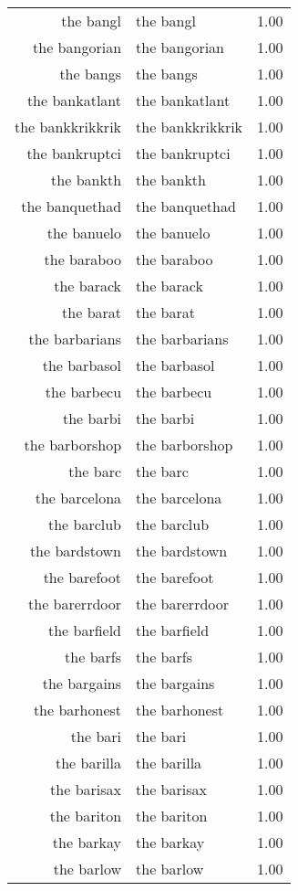 \begin{table}[ht]
\begin{tabular}{rlr}
  the bangl & the bangl & 1.00 \\ 
  the bangorian & the bangorian & 1.00 \\ 
  the bangs & the bangs & 1.00 \\ 
  the bankatlant & the bankatlant & 1.00 \\ 
  the bankkrikkrik & the bankkrikkrik & 1.00 \\ 
  the bankruptci & the bankruptci & 1.00 \\ 
  the bankth & the bankth & 1.00 \\ 
  the banquethad & the banquethad & 1.00 \\ 
  the banuelo & the banuelo & 1.00 \\ 
  the baraboo & the baraboo & 1.00 \\ 
  the barack & the barack & 1.00 \\ 
  the barat & the barat & 1.00 \\ 
  the barbarians & the barbarians & 1.00 \\ 
  the barbasol & the barbasol & 1.00 \\ 
  the barbecu & the barbecu & 1.00 \\ 
  the barbi & the barbi & 1.00 \\ 
  the barborshop & the barborshop & 1.00 \\ 
  the barc & the barc & 1.00 \\ 
  the barcelona & the barcelona & 1.00 \\ 
  the barclub & the barclub & 1.00 \\ 
  the bardstown & the bardstown & 1.00 \\ 
  the barefoot & the barefoot & 1.00 \\ 
  the barerrdoor & the barerrdoor & 1.00 \\ 
  the barfield & the barfield & 1.00 \\ 
  the barfs & the barfs & 1.00 \\ 
  the bargains & the bargains & 1.00 \\ 
  the barhonest & the barhonest & 1.00 \\ 
  the bari & the bari & 1.00 \\ 
  the barilla & the barilla & 1.00 \\ 
  the barisax & the barisax & 1.00 \\ 
  the bariton & the bariton & 1.00 \\ 
  the barkay & the barkay & 1.00 \\ 
  the barlow & the barlow & 1.00 \\ 

\end{tabular}
\end{table}
